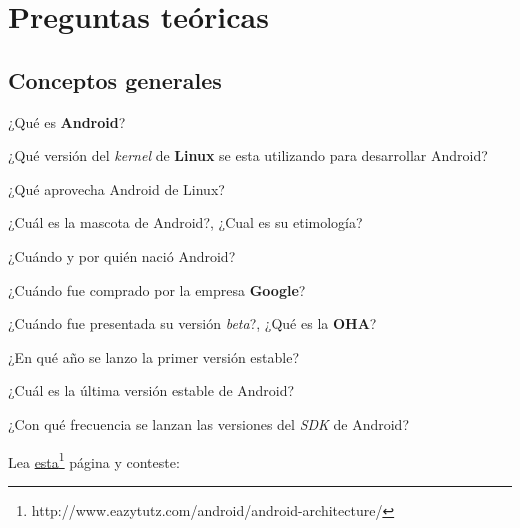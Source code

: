 \section{Preguntas teóricas}

\subsection{Conceptos generales}
\begin{questions}
  \question ¿Qué es \textbf{Android}?
  
  \question ¿Qué versión del \textit{kernel} de \textbf{Linux} se esta utilizando para desarrollar Android?

  \question ¿Qué aprovecha Android de Linux?

  \question ¿Cuál es la mascota de Android?, ¿Cual es su etimología?
  
  \question ¿Cuándo y por quién nació Android?
  
  \question ¿Cuándo fue comprado por la empresa \textbf{Google}?
  
  \question ¿Cuándo fue presentada su versión \textit{beta}?, ¿Qué es la \textbf{OHA}?
  
  \question ¿En qué año se lanzo la primer versión estable?
  
  \question ¿Cuál es la última versión estable de Android?
  
  \question ¿Con qué frecuencia se lanzan las versiones del \textit{SDK} de Android?
  
  \question Lea \href{http://www.eazytutz.com/android/android-architecture/}{esta}\footnote{http://www.eazytutz.com/android/android-architecture/} página y conteste:
\end{questions}

